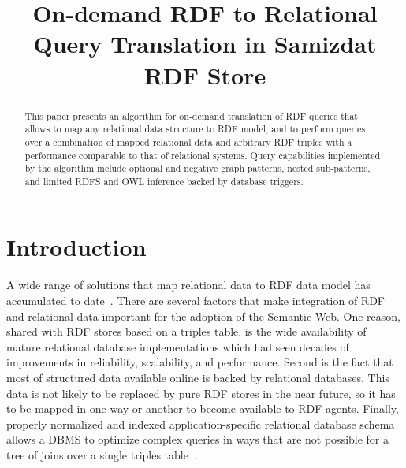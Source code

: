 \documentclass[conference,letterpaper]{IEEEtran}
\begin{document}
%
\title{On-demand RDF to Relational Query Translation in Samizdat RDF
Store}
%
\author{
}

\maketitle              %

\begin{abstract}

This paper presents an algorithm for on-demand translation of RDF
queries that allows to map any relational data structure to RDF model,
and to perform queries over a combination of mapped relational data and
arbitrary RDF triples with a performance comparable to that of
relational systems. Query capabilities implemented by the algorithm
include optional and negative graph patterns, nested sub-patterns, and
limited RDFS and OWL inference backed by database triggers.

\end{abstract}


\section{Introduction}
\label{introduction}


A wide range of solutions that map relational data to RDF data model has
accumulated to date~\cite{triplify}. There are several factors that make
integration of RDF and relational data important for the adoption of the
Semantic Web. One reason, shared with RDF stores based on a triples
table, is the wide availability of mature relational database
implementations which had seen decades of improvements in reliability,
scalability, and performance. Second is the fact that most of structured
data available online is backed by relational databases. This data is
not likely to be replaced by pure RDF stores in the near future, so it
has to be mapped in one way or another to become available to RDF
agents. Finally, properly normalized and indexed application-specific
relational database schema allows a DBMS to optimize complex queries in
ways that are not possible for a tree of joins over a single triples
table~\cite{sp2b}.
\end{document}
